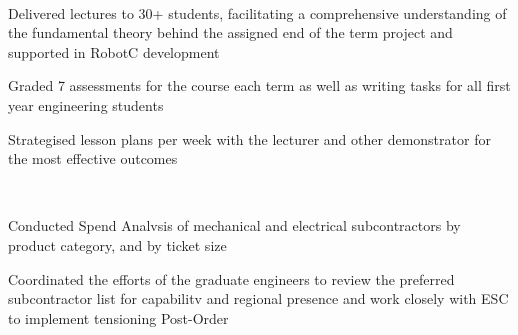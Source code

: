 \documentclass[11pt, a4paper]{MagicalCV}
\begin{document}
\begin{minipage}[t]{0.58\textwidth}
 \\
\vspace{\topsep} %
\begin{tightemize}
\item Delivered lectures to 30+ students, facilitating a comprehensive understanding of the fundamental theory behind the assigned end of the term project and supported in RobotC development
\item Graded 7 assessments for the course each term as well as writing tasks for all first year engineering students
\item Strategised lesson plans per week with the lecturer and other demonstrator for the most effective outcomes
\end{tightemize}
\sectionsep

 \\
\vspace{\topsep} %
\begin{tightemize}
\item Conducted Spend Analvsis of mechanical and electrical subcontractors by product category, and by ticket size
\item Coordinated the efforts of the graduate engineers to review the preferred subcontractor list for capabilitv and regional
presence and work closely with ESC to implement tensioning Post-Order
\end{tightemize}
\sectionsep
\end{minipage} 
\end{document}
